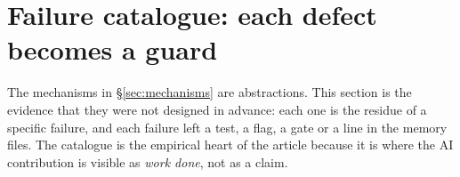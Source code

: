 \section{Failure catalogue: each defect becomes a guard}
\label{sec:failures}

The mechanisms in \S\ref{sec:mechanisms} are abstractions. This section is the
evidence that they were not designed in advance: each one is the residue of a
specific failure, and each failure left a test, a flag, a gate or a line in the
memory files. The catalogue is the empirical heart of the article because it is
where the AI contribution is visible as \emph{work done}, not as a claim.

